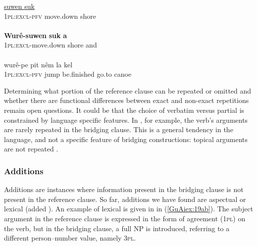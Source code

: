 \documentclass[output=paper]{LSP/langsci}
\begin{document}
\begin{exe}
\ex \label{GuAiex:18ac}
\begin{xlist}
\ex \label{GuAiex:18a}
\gll \underline{}   \underline{suwen }    \underline{suk}\\
\textsc{1pl:excl-pfv}  move.down  shore\\
\glt {} \\
\ex \label{GuAiex:18b}
\gll \textbf{Wurê-suwen}      \textbf{suk}  \textbf{ a} \\
\textsc{1pl:excl-}move.down    shore  and    \\
\glt {}\\
\ex \label{GuAiex:18c}
\gll wurê-pe   pit   nêm     la   kel \\
\textsc{1pl:excl-pfv} jump   be.finished   go.to   canoe\\
\glt {}
\end{xlist}
\end{exe}



Determining what portion of the reference clause can be repeated or omitted and whether there are functional differences between exact and non-exact repetitions remain open questions. It could be that the choice of verbatim versus partial  is constrained by language specific features. In , for example, the verb’s arguments are rarely repeated in the bridging clause. This is a general tendency in the language, and not a specific feature of bridging constructions: topical arguments are not repeated \citep[][295--296]{vangijn14}. 

\subsubsection{Additions}
\label{GuAi313add}
Additions are instances where information present in the bridging clause is not present in the reference clause. So far, additions we have found are aspectual or lexical (added ). An example of lexical  is given in  in (\ref{GuAiex:19ab}). The subject argument in the reference clause is expressed in the form of agreement (\textsc{1pl}) on the verb, but in the bridging clause, a full NP is introduced, referring to a different person–number value, namely \textsc{3pl}.
\end{document}
